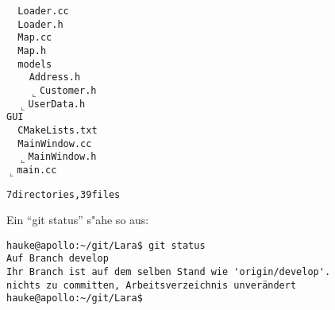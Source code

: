\documentclass[german,a4paper]{report}
\begin{document}
\begin{alltt}
    \textbar\ \  \textbar\textendash\textendash Loader.cc
    \textbar\ \  \textbar\textendash\textendash Loader.h
    \textbar\ \  \textbar\textendash\textendash Map.cc
    \textbar\ \  \textbar\textendash\textendash Map.h
    \textbar\ \  \textbar\textendash\textendash models
    \textbar\ \  \textbar\ \  \textbar\textendash\textendash Address.h
    \textbar\ \  \textbar\ \  \(\llcorner\)\textendash\textendash Customer.h
    \textbar\ \  \(\llcorner\)\textendash\textendash UserData.h
    \textbar\textendash\textendash GUI
    \textbar\ \  \textbar\textendash\textendash CMakeLists.txt
    \textbar\ \  \textbar\textendash\textendash MainWindow.cc
    \textbar\ \  \(\llcorner\)\textendash\textendash MainWindow.h
    \(\llcorner\)\textendash\textendash main.cc

7 directories, 39 files
\end{alltt}
Ein ``git status'' s"ahe so aus:
\begin{verbatim}
hauke@apollo:~/git/Lara$ git status
Auf Branch develop
Ihr Branch ist auf dem selben Stand wie 'origin/develop'.
nichts zu committen, Arbeitsverzeichnis unverändert
hauke@apollo:~/git/Lara$
\end{verbatim}
\end{document}
